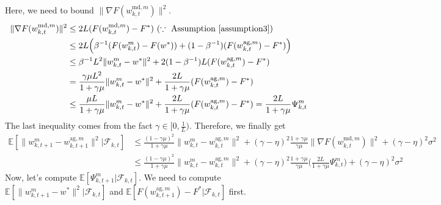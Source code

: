 \documentclass[11pt]{article}
\begin{document}
Here, we need to bound $\|\nabla F(w_{k, t}^{\textrm{md}, m})\|^2$.
\begin{align} \label{ineq3.5-2}
    \|\nabla F(w_{k, t}^{\textrm{md}, m})\|^2 &\leq 2L(F(w_{k, t}^{\textrm{md}, m}) - F^*) \textrm{ }(\because \textrm{ Assumption \ref{assumption3}}) \nonumber\\
    &\leq 2L\Big(\beta^{-1}(F(w_{k, t}^m)-F(w^*))+(1-\beta^{-1})(F(w_{k, t}^{\textrm{ag}, m})-F^*)\Big) \nonumber\\
    &\leq \beta^{-1}L^2 \|w_{k, t}^m - w^*\|^2 + 2(1-\beta^{-1})L(F(w_{k, t}^{\textrm{ag}, m})-F^*) \nonumber\\
    &= \frac{\gamma\mu L^2}{1+\gamma\mu}\|w_{k, t}^m - w^*\|^2 + \frac{2L}{1+\gamma\mu}(F(w_{k, t}^{\textrm{ag}, m})-F^*) \nonumber\\
    &\leq \frac{\mu L}{1+\gamma\mu}\|w_{k, t}^m - w^*\|^2 + \frac{2L}{1+\gamma\mu}(F(w_{k, t}^{\textrm{ag}, m})-F^*) = \frac{2L}{1+\gamma\mu}\Psi_{k, t}^m
\end{align}
The last inequality comes from the fact $\gamma \in [0, \frac{1}{L})$. Therefore, we finally get
\begin{align} \label{ineq3.5-3}
    \mathbb{E}[\|w_{k, t+1}^m - w_{k, t+1}^{\textrm{ag}, m}\|^2|\mathcal{F}_{k, t}] &\leq \frac{(1-\gamma\mu)^2}{1+\gamma\mu}\|w_{k, t}^m - w_{k, t}^{\textrm{ag}, m}\|^2 + (\gamma-\eta)^2\frac{1+\gamma\mu}{\gamma\mu}\|\nabla F(w_{k, t}^{\textrm{md}, m})\|^2 + (\gamma-\eta)^2\sigma^2 \nonumber\\
    &\leq \frac{(1-\gamma\mu)^2}{1+\gamma\mu}\|w_{k, t}^m - w_{k, t}^{\textrm{ag}, m}\|^2 + (\gamma-\eta)^2\frac{1+\gamma\mu}{\gamma\mu}\Big(\frac{2L}{1+\gamma\mu}\Psi_{k, t}^m\Big) + (\gamma-\eta)^2\sigma^2
\end{align}
Now, let's compute $\mathbb{E}[\Psi_{k, t+1}^m|\mathcal{F}_{k, t}]$. We need to compute $\mathbb{E}[\|w_{k, t+1}^m-w^*\|^2|\mathcal{F}_{k, t}]$ and $\mathbb{E}[F(w_{k, t+1}^{\textrm{ag}, m}) - F^*|\mathcal{F}_{k, t}]$ first.
\end{document}
